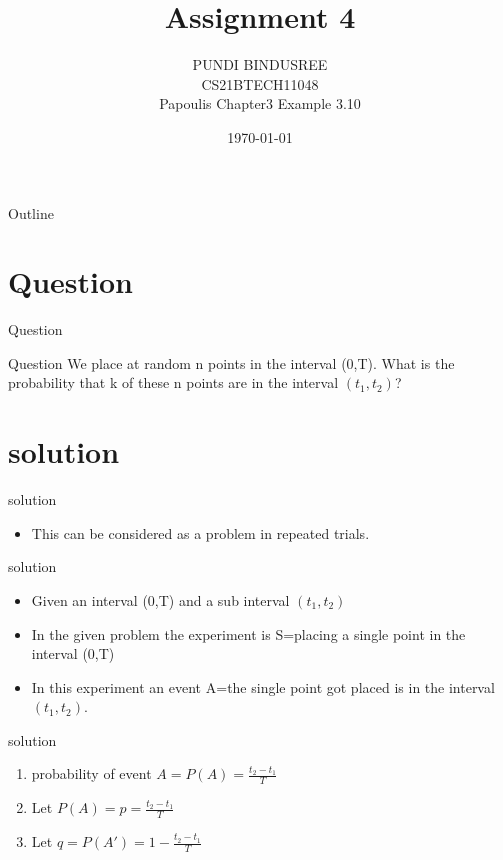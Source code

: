 \documentclass{beamer}
\title{Assignment 4}
\author{PUNDI BINDUSREE \\
     CS21BTECH11048 \\
     Papoulis Chapter3 Example 3.10\\ }
\date{\today}
\begin{document}
     
\begin{frame}
    \maketitle    
\end{frame}
     
     \logo{}
     
     \begin{frame}{Outline}
    \tableofcontents
     \end{frame}

   \section{Question}
   \begin{frame}{Question}
   \begin{block}{Question}
   We place at random n points in the interval (0,T). What is the probability that k of these n points are in the interval $(t_1,t_2)$?
 \end{block}
 \end{frame} 
 
 \section{solution}
 \begin{frame}{solution}
 \begin{itemize}
     \item This can be considered as a problem in repeated trials.
 \end{itemize}
 \end{frame}
 
 \begin{frame}{solution}
 \begin{itemize}
     \item Given an interval (0,T) and a sub interval $(t_1,t_2)$ 
      \item In the given problem the experiment is S={placing a single point in the interval (0,T)}
     \item In this experiment an event A={the single point got placed is in the interval $(t_1,t_2)$.}
 \end{itemize}
 \end{frame}
 
 \begin{frame}{solution}
 \begin{enumerate}
     \item probability of event $A=P(A)=\frac{t_2-t_1}{T}$
     \item Let $P(A)=p=\frac{t_2-t_1}{T}$
     \item Let $q=P(A')=1-\frac{t_2-t_1}{T}$
 \end{enumerate}
 \end{frame}
 
\end{document}
